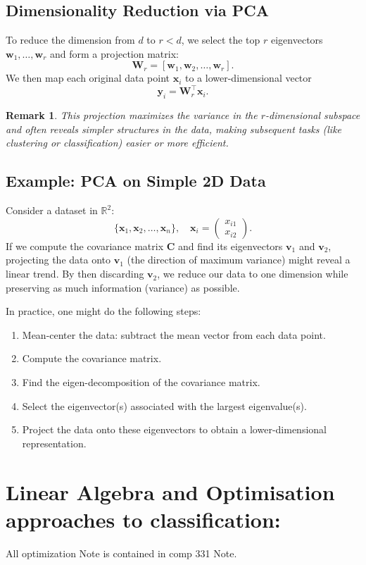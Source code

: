 \documentclass[12pt,a4paper]{article}
\newtheorem{remark}{Remark}
\begin{document}
\subsection{Dimensionality Reduction via PCA}
To reduce the dimension from $d$ to $r < d$, we select the top $r$ eigenvectors $\mathbf{w}_1,\ldots,\mathbf{w}_r$ and form a projection matrix:
\[
\mathbf{W}_r = [\mathbf{w}_1, \mathbf{w}_2, \ldots, \mathbf{w}_r].
\]
We then map each original data point $\mathbf{x}_i$ to a lower-dimensional vector
\[
\mathbf{y}_i = \mathbf{W}_r^\top \mathbf{x}_i.
\]

\begin{remark}
This projection maximizes the variance in the $r$-dimensional subspace and often reveals simpler structures in the data, making subsequent tasks (like clustering or classification) easier or more efficient.
\end{remark}

\subsection{Example: PCA on Simple 2D Data}
Consider a dataset in $\mathbb{R}^2$:
\[
\{\mathbf{x}_1,\mathbf{x}_2,\ldots,\mathbf{x}_n\}, \quad \mathbf{x}_i=\begin{pmatrix}x_{i1}\\x_{i2}\end{pmatrix}.
\]
If we compute the covariance matrix $\mathbf{C}$ and find its eigenvectors $\mathbf{v}_1$ and $\mathbf{v}_2$, projecting the data onto $\mathbf{v}_1$ (the direction of maximum variance) might reveal a linear trend. By then discarding $\mathbf{v}_2$, we reduce our data to one dimension while preserving as much information (variance) as possible.

In practice, one might do the following steps:
\begin{enumerate}
    \item Mean-center the data: subtract the mean vector from each data point.
    \item Compute the covariance matrix.
    \item Find the eigen-decomposition of the covariance matrix.
    \item Select the eigenvector(s) associated with the largest eigenvalue(s).
    \item Project the data onto these eigenvectors to obtain a lower-dimensional representation.
\end{enumerate}


\section{Linear Algebra and Optimisation approaches to classification:}
All optimization Note is contained in comp 331 Note.
\end{document}
